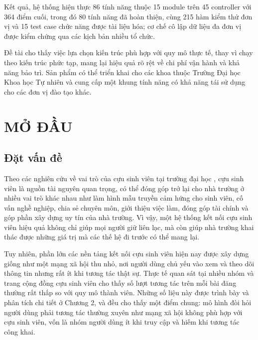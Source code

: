 \documentclass[12pt,a4paper,oneside]{report}
\begin{document}
Kết quả, hệ thống hiện thực 86 tính năng thuộc 15 module trên 45 controller với 364 điểm cuối, trong đó 80 tính năng đã hoàn thiện, cùng 215 hàm kiểm thử đơn vị và 15 test case chức năng được tài liệu hóa; cơ chế cô lập dữ liệu đa đơn vị được kiểm chứng qua các kịch bản nhiều tổ chức.

Đề tài cho thấy việc lựa chọn kiến trúc phù hợp với quy mô thực tế, thay vì chạy theo kiến trúc phức tạp, mang lại hiệu quả rõ rệt về chi phí vận hành và khả năng bảo trì. Sản phẩm có thể triển khai cho các khoa thuộc Trường Đại học Khoa học Tự nhiên và cung cấp một khung tính năng có khả năng tái sử dụng cho các đơn vị đào tạo khác.

\newpage
{}
\setcounter{page}{1}

\chapter{MỞ ĐẦU}

\section{Đặt vấn đề}

Theo các nghiên cứu về vai trò của cựu sinh viên tại trường đại học \cite{obeng,unisel}, cựu sinh viên là nguồn tài nguyên quan trọng, có thể đóng góp trở lại cho nhà trường ở nhiều vai trò khác nhau như làm hình mẫu truyền cảm hứng cho sinh viên, cố vấn nghề nghiệp, chia sẻ chuyên môn, giới thiệu việc làm, đóng góp tài chính và góp phần xây dựng uy tín của nhà trường. Vì vậy, một hệ thống kết nối cựu sinh viên hiệu quả không chỉ giúp mọi người giữ liên lạc, mà còn giúp nhà trường khai thác được những giá trị mà các thế hệ đi trước có thể mang lại.

Tuy nhiên, phần lớn các nền tảng kết nối cựu sinh viên hiện nay được xây dựng giống như một mạng xã hội thu nhỏ, nơi người dùng chủ yếu vào xem và theo dõi thông tin nhưng rất ít khi tương tác thật sự. Thực tế quan sát tại nhiều nhóm và trang cộng đồng cựu sinh viên cho thấy số lượt tương tác trên mỗi bài đăng thường rất thấp so với quy mô thành viên. Những số liệu này được trình bày và phân tích chi tiết ở Chương 2, và đều cho thấy một điểm chung: mô hình đòi hỏi người dùng phải tương tác thường xuyên như mạng xã hội không phù hợp với cựu sinh viên, vốn là nhóm người dùng ít khi truy cập và hiếm khi tương tác công khai.
\end{document}
